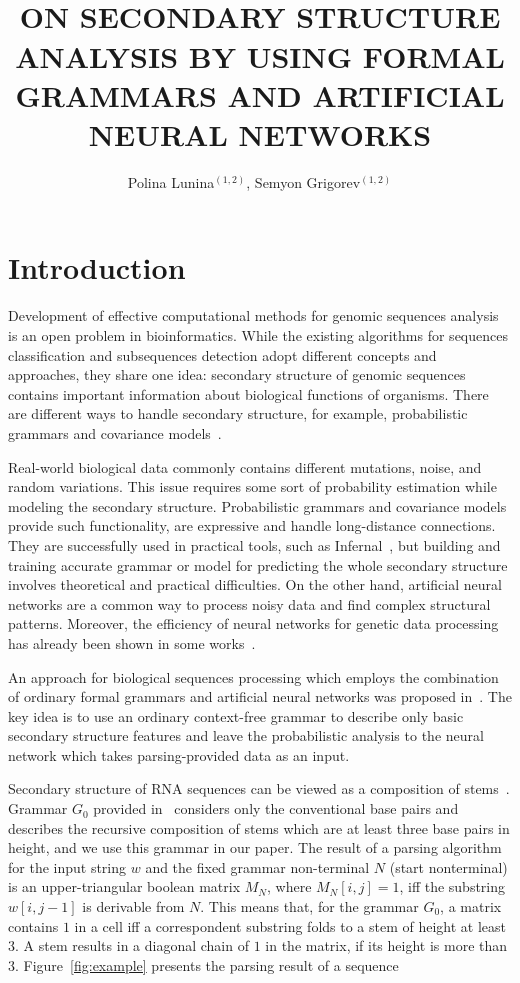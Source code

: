\documentclass[12pt,a4paper]{cibb}
\title{\large $\ $\\ \bf ON SECONDARY STRUCTURE ANALYSIS BY USING FORMAL GRAMMARS AND ARTIFICIAL NEURAL NETWORKS}
\author{ Polina Lunina$^{(1,2)}$, Semyon Grigorev$^{(1,2)}$}
\begin{document}
\thispagestyle{myheadings}
\pagestyle{myheadings}



\section{\bf Introduction}

Development of effective computational methods for genomic sequences analysis is an open problem in bioinformatics.
While the existing algorithms for sequences classification and subsequences detection adopt different concepts and approaches, they share one idea: secondary structure of genomic sequences contains important information about biological functions of organisms.
There are different ways to handle secondary structure, for example, probabilistic grammars and covariance models~\cite{EddyDurbin, dowell2004evaluation, knudsen1999rna}.

Real-world biological data commonly contains different mutations, noise, and random variations.
This issue requires some sort of probability estimation while modeling the secondary structure.
Probabilistic grammars and covariance models provide such functionality, are expressive and handle long-distance connections.
They are successfully used in practical tools, such as Infernal~\cite{Infernal}, but building and training accurate grammar or model for predicting the whole secondary structure involves theoretical and practical difficulties.
On the other hand, artificial neural networks are a common way to process noisy data and find complex structural patterns.
Moreover, the efficiency of neural networks for genetic data processing has already been shown in some works~\cite{Humidor,ANN}.

An approach for biological sequences processing which employs the combination of ordinary formal grammars and artificial neural networks was proposed in~\cite{grigorevcomposition}.
The key idea is to use an ordinary context-free grammar to describe only basic secondary structure features and leave the probabilistic analysis to the neural network which takes parsing-provided data as an input.

Secondary structure of RNA sequences can be viewed as a composition of stems~\cite{MQbioinformatics19}.
Grammar $G_0$ provided in~\cite{grigorevcomposition} considers only the conventional base pairs and describes the recursive composition of stems which are at least three base pairs in height, and we use this grammar in our paper.
The result of a parsing algorithm for the input string $w$ and the fixed grammar non-terminal $N$ (start nonterminal) is an upper-triangular boolean matrix $M_N$, where $M_N [i,j] = 1$, iff the substring $w[i,j-1]$ is derivable from $N$.
This means that, for the grammar $G_0$, a matrix contains $1$ in a cell iff a correspondent substring folds to a  stem of height at least 3.
A stem results in a diagonal chain of $1$ in the matrix, if its height is more than 3.
Figure~\ref{fig:example} presents the parsing result of a sequence
\end{document}
